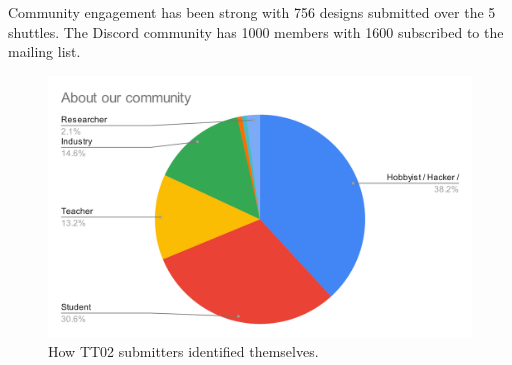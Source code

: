 Community engagement has been strong with 756 designs submitted over the 5 shuttles.
The Discord community has 1000 members with 1600 subscribed to the mailing list.

\begin{figure}[htp]
\centering
\includegraphics[width=\columnwidth]{./Figs/about our community pie chart.png}
\caption{How TT02 submitters identified themselves.}
\label{fig:TT02_submitters}
\end{figure}
